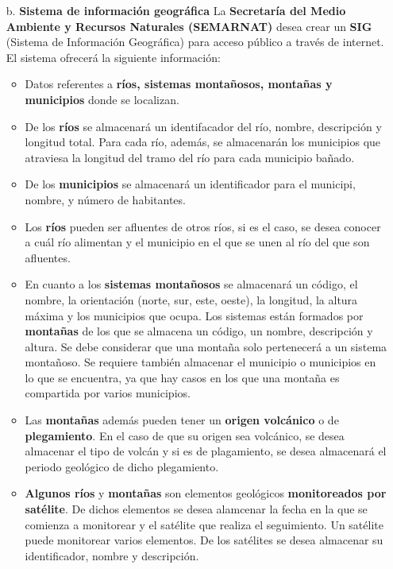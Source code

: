 \documentclass[letterpaper,11pt]{article}
\begin{document}
\begin{itemize}
    \item[b.] \textbf{Sistema de información geográfica}
    La \textbf{Secretaría del Medio Ambiente y Recursos Naturales (SEMARNAT)}
    desea crear un \textbf{SIG} (Sistema de Información Geográfica) para acceso
    público a través de internet. El sistema ofrecerá la siguiente información:

    \begin{itemize}
        \item Datos referentes a \textbf{ríos, sistemas montañosos, montañas y
              municipios} donde se localizan.
        \item De los \textbf{ríos} se almacenará un identifacador del río, nombre,
              descripción y longitud total. Para cada río, además, se almacenarán
              los municipios que atraviesa la longitud del tramo del río para cada
              municipio bañado.
        \item De los \textbf{municipios} se almacenará un identificador para
              el municipi, nombre, y número de habitantes.
        \item Los \textbf{ríos} pueden ser afluentes de otros ríos, si es el caso,
              se desea conocer a cuál río alimentan y el municipio en el que se unen
              al río del que son afluentes.
        \item En cuanto a los \textbf{sistemas montañosos} se almacenará un código,
              el nombre, la orientación (norte, sur, este, oeste), la longitud, la
              altura máxima y los municipios que ocupa. Los sistemas están formados
              por \textbf{montañas} de los que se almacena un código, un nombre,
              descripción y altura. Se debe considerar que una montaña solo
              pertenecerá a un sistema montañoso. Se requiere también almacenar
              el municipio o municipios en lo que se encuentra, ya que hay casos
              en los que una montaña es compartida por varios municipios.
        \item Las \textbf{montañas} además pueden tener un \textbf{origen volcánico}
              o de \textbf{plegamiento}. En el caso de que su origen sea volcánico,
              se desea almacenar el tipo de volcán y si es de plagamiento, se desea
              almacenará el periodo geológico de dicho plegamiento.

        \item \textbf{Algunos ríos} y \textbf{montañas} son elementos geológicos
              \textbf{monitoreados por satélite}. De dichos elementos se desea
              alamcenar la fecha en la que se comienza a monitorear y el satélite
              que realiza el seguimiento. Un satélite puede monitorear varios
              elementos. De los satélites se desea almacenar su identificador,
              nombre y descripción.


\end{itemize}
\end{itemize}
\end{document}
